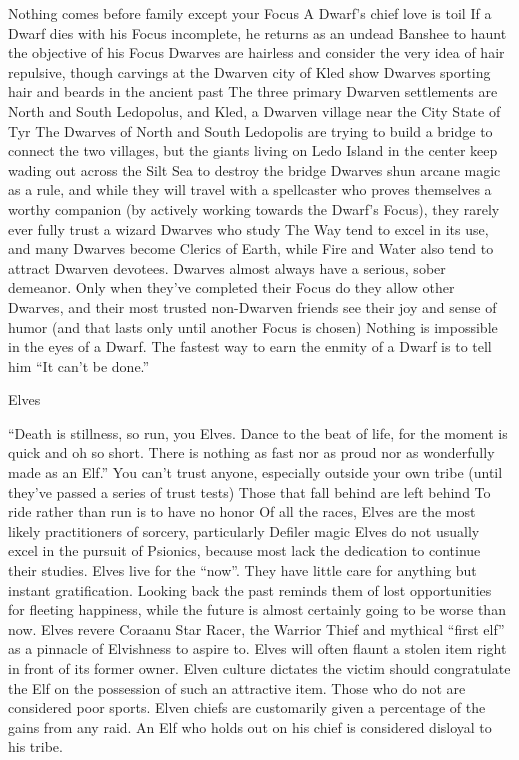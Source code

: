     Nothing comes before family except your Focus
    A Dwarf’s chief love is toil
    If a Dwarf dies with his Focus incomplete, he returns as an undead Banshee to haunt the objective of his Focus
    Dwarves are hairless and consider the very idea of hair repulsive, though carvings at the Dwarven city of Kled show Dwarves sporting hair and beards in the ancient past
    The three primary Dwarven settlements are North and South Ledopolus, and Kled, a Dwarven village near the City State of Tyr
    The Dwarves of North and South Ledopolis are trying to build a bridge to connect the two villages, but the giants living on Ledo Island in the center keep wading out across the Silt Sea to destroy the bridge
    Dwarves shun arcane magic as a rule, and while they will travel with a spellcaster who proves themselves a worthy companion (by actively working towards the Dwarf’s Focus), they rarely ever fully trust a wizard
    Dwarves who study The Way tend to excel in its use, and many Dwarves become Clerics of Earth, while Fire and Water also tend to attract Dwarven devotees.
    Dwarves almost always have a serious, sober demeanor. Only when they’ve completed their Focus do they allow other Dwarves, and their most trusted non-Dwarven friends see their joy and sense of humor (and that lasts only until another Focus is chosen)
    Nothing is impossible in the eyes of a Dwarf. The fastest way to earn the enmity of a Dwarf is to tell him “It can’t be done.”

Elves

    “Death is stillness, so run, you Elves. Dance to the beat of life, for the moment is quick and oh so short. There is nothing as fast nor as proud nor as wonderfully made as an Elf.”
    You can’t trust anyone, especially outside your own tribe (until they’ve passed a series of trust tests)
    Those that fall behind are left behind
    To ride rather than run is to have no honor
    Of all the races, Elves are the most likely practitioners of sorcery, particularly Defiler magic
    Elves do not usually excel in the pursuit of Psionics, because most lack the dedication to continue their studies.
    Elves live for the “now”. They have little care for anything but instant gratification. Looking back the past reminds them of lost opportunities for fleeting happiness, while the future is almost certainly going to be worse than now.
    Elves revere Coraanu Star Racer, the Warrior Thief and mythical “first elf” as a pinnacle of Elvishness to aspire to.
    Elves will often flaunt a stolen item right in front of its former owner. Elven culture dictates the victim should congratulate the Elf on the possession of such an attractive item. Those who do not are considered poor sports.
    Elven chiefs are customarily given a percentage of the gains from any raid. An Elf who holds out on his chief is considered disloyal to his tribe.

